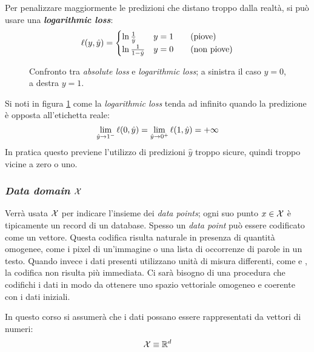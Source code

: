 Per penalizzare maggiormente le predizioni che distano troppo dalla realtà, si può usare una
\textit{\textbf{logarithmic loss}}:
$$ \ell(y,\hat{y}) = \begin{cases} \ln{\frac{1}{\hat{y}}} & y=1 \qquad 
(\text{piove}) \\ \ln{\frac{1}{1-\hat{y}}} & y=0 \qquad (\text{non piove}) \end{cases} $$

\begin{figure}[h]
    \centering
    \begin{subfigure}{.43\textwidth}
        \centering
        
    \end{subfigure}
    \begin{subfigure}{.43\textwidth}
        \centering
        
    \end{subfigure}
    \caption{Confronto tra \textit{\color{cyan}absolute loss} e \textit{\color{orange}
    logarithmic loss}; a sinistra il caso $y=0$, a destra $y=1$. \label{fig:abs_vs_log}}
\end{figure}

Si noti in figura \ref{fig:abs_vs_log} come la \textit{logarithmic loss} tenda ad
infinito quando la predizione è opposta all'etichetta reale:
$$\lim_{\hat{y}\rightarrow 1^-} \ell(0,\hat{y})=\lim_{\hat{y}\rightarrow 0^+}
\ell(1,\hat{y}) = +\infty$$
In pratica questo previene 
l'utilizzo di predizioni $\hat{y}$ troppo sicure, quindi troppo vicine a zero o uno.

\subsubsection{\textit{Data domain} \texorpdfstring{$\mathcal{X}$}{X}}
Verrà usata $\mathcal{X}$ per indicare l'insieme dei \textit{data points}; ogni suo punto $x \in \mathcal{X}$
è tipicamente un record di un database. Spesso un \textit{data point} può essere codificato 
come un vettore. Questa codifica risulta naturale in presenza di quantità omogenee, come i
pixel di un'immagine o una lista di occorrenze di parole in un testo. Quando invece i dati
presenti utilizzano unità di misura differenti, come  e , la
codifica non risulta più immediata. Ci sarà bisogno di una procedura che codifichi i dati
in modo da ottenere uno spazio vettoriale omogeneo e coerente con i dati iniziali.

In questo corso si assumerà che i dati possano essere rappresentati da vettori di numeri:
$$ \mathcal{X} \equiv \mathbb{R}^d $$

